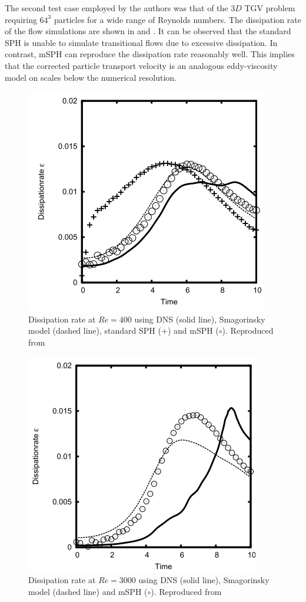 The second test case employed by the authors was that of the $3D$ TGV problem requiring $64^3$ particles for a wide range of Reynolds numbers. The dissipation rate of the flow simulations are shown in  and . It can be observed that the standard SPH is unable to simulate transitional flows due to excessive dissipation. In contrast, mSPH can reproduce the dissipation rate reasonably well. This implies that the corrected particle transport velocity is an analogous eddy-viscosity model on scales below the numerical resolution.
\begin{figure}[H]
    \centering
    \includegraphics[scale=0.7]{Figures/research_papers/adami2012-dissipation-re400.png}
    \caption{Dissipation rate at $Re = 400$ using DNS (solid line), Smagorinsky model (dashed line), standard SPH ($+$) and mSPH ($\circ$). Reproduced from \cite{Adami2012}}
    \label{fig:adami2012-dissipation-re400}
\end{figure}
\begin{figure}[H]
    \centering
    \includegraphics[scale=0.7]{Figures/research_papers/adami2012-dissipation-re3000.png}
    \caption{Dissipation rate at $Re = 3000$ using DNS (solid line), Smagorinsky model (dashed line) and mSPH ($\circ$). Reproduced from \cite{Adami2012}}
    \label{fig:adami2012-dissipation-re3000}
\end{figure}

